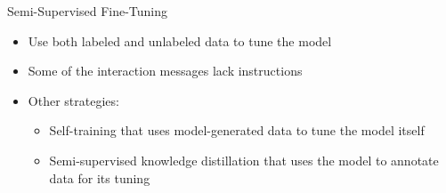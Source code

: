 \begin{vbframe}{Semi-Supervised Fine-Tuning}

\vfill

\begin{itemize}
\item Use both labeled and unlabeled data to tune the model
\item Some of the interaction messages lack instructions
\item Other strategies:
    \begin{itemize}
    \item Self-training that uses model-generated data to tune the model itself
    \item Semi-supervised knowledge distillation that uses the model to annotate data for its tuning
    \end{itemize}
\end{itemize}

\vfill

\end{vbframe}


